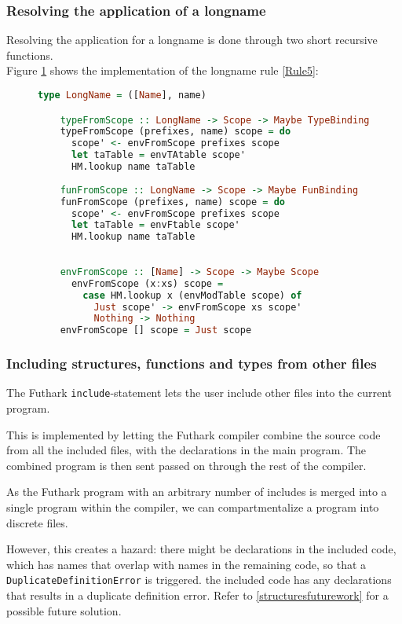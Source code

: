 \subsubsection{Resolving the application of a longname}
Resolving the application for a longname is done through two short recursive
functions.
\\
Figure \ref{resolvelongname} shows the implementation of the longname rule
\ref{Rule5}:
\begin{figure}\label{resolvelongname}
  \begin{lstlisting}[language=Haskell]
    type LongName = ([Name], name)

    typeFromScope :: LongName -> Scope -> Maybe TypeBinding
    typeFromScope (prefixes, name) scope = do
      scope' <- envFromScope prefixes scope
      let taTable = envTAtable scope'
      HM.lookup name taTable
    
    funFromScope :: LongName -> Scope -> Maybe FunBinding
    funFromScope (prefixes, name) scope = do
      scope' <- envFromScope prefixes scope
      let taTable = envFtable scope'
      HM.lookup name taTable
    
    
    envFromScope :: [Name] -> Scope -> Maybe Scope
      envFromScope (x:xs) scope =
        case HM.lookup x (envModTable scope) of
          Just scope' -> envFromScope xs scope'
          Nothing -> Nothing
    envFromScope [] scope = Just scope
\end{lstlisting}
\end{figure}

\subsubsection{Including structures, functions and types from other files}\label{structuresincludes}
The Futhark \texttt{include}-statement lets the user include
other files into the current program.

This is implemented by letting the Futhark compiler combine the source code from
all the included files, with the declarations in the main program. The combined
program is then sent passed on through the rest of the compiler.

As the Futhark program with an arbitrary number of includes is merged into a
single program within the compiler, we can compartmentalize a program into
discrete files.

However, this creates a hazard: there might be declarations in the included
code, which has names that overlap with names in the remaining code, so that a
\texttt{DuplicateDefinitionError} is triggered. the included code has any declarations
that results in a duplicate definition error. Refer to
\ref{structuresfuturework} for a possible future solution.

